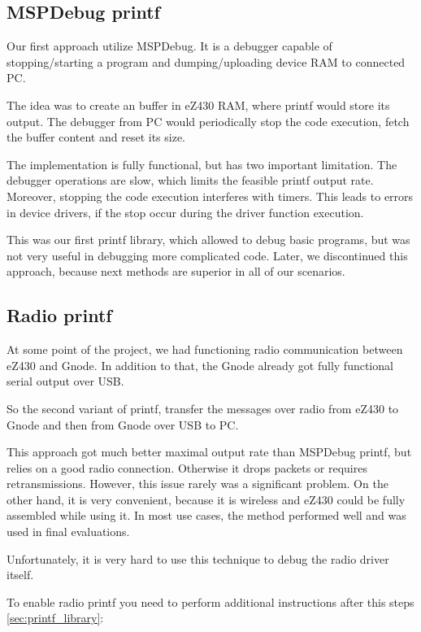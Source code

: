 \subsection{MSPDebug printf}

Our first approach utilize MSPDebug.
It is a debugger capable of stopping/starting a program and dumping/uploading device RAM to connected PC.

The idea was to create an buffer in eZ430 RAM, where printf would store its output.
The debugger from PC would periodically stop the code execution, fetch the buffer content and reset its size.

The implementation is fully functional, but has two important limitation.
The debugger operations are slow, which limits the feasible printf output rate.
Moreover, stopping the code execution interferes with timers.
This leads to errors in device drivers, if the stop occur during the driver function execution.

This was our first printf library, which allowed to debug basic programs, but was not very useful in debugging more complicated code.
Later, we discontinued this approach, because next methods are superior in all of our scenarios.

\subsection{Radio printf}


At some point of the project, we had functioning radio communication between eZ430 and Gnode.
In addition to that, the Gnode already got fully functional serial output over USB. 

So the second variant of printf, transfer the messages over radio from eZ430 to Gnode and then from Gnode over USB to PC.

This approach got much better maximal output rate than MSPDebug printf, but relies on a good radio connection.
Otherwise it drops packets or requires retransmissions.
However, this issue rarely was a significant problem.
On the other hand, it is very convenient, because it is wireless and eZ430 could be fully assembled while using it.
In most use cases, the method performed well and was used in final evaluations.

Unfortunately, it is very hard to use this technique to debug the radio driver itself.

To enable radio printf you need to perform additional
instructions after this steps \ref{sec:printf_library}:

